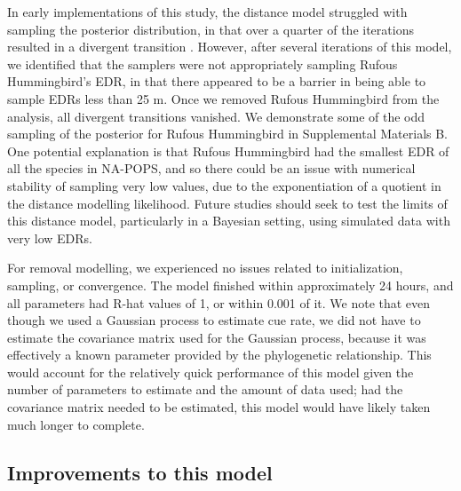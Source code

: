 \documentclass[12pt]{article}
\begin{document}
\par In early implementations of this study, the distance model struggled with sampling the posterior distribution, in that over a quarter of the iterations resulted in a divergent transition \citep{betancourt_diagnosing_2016, leimkuhler_simulating_2005}.
However, after several iterations of this model, we identified that the samplers were not appropriately sampling Rufous Hummingbird's EDR, in that there appeared to be a barrier in being able to sample EDRs less than 25 m. 
Once we removed Rufous Hummingbird from the analysis, all divergent transitions vanished.
We demonstrate some of the odd sampling of the posterior for Rufous Hummingbird in Supplemental Materials B.
One potential explanation is that Rufous Hummingbird had the smallest EDR of all the species in NA-POPS, and so there could be an issue with numerical stability of sampling very low values, due to the exponentiation of a quotient in the distance modelling likelihood.
Future studies should seek to test the limits of this distance model, particularly in a Bayesian setting, using simulated data with very low EDRs.

\par For removal modelling, we experienced no issues related to initialization, sampling, or convergence. 
The model finished within approximately 24 hours, and all parameters had R-hat values of 1, or within 0.001 of it.
We note that even though we used a Gaussian process to estimate cue rate, we did not have to estimate the covariance matrix used for the Gaussian process, because it was effectively a known parameter provided by the phylogenetic relationship.
This would account for the relatively quick performance of this model given the number of parameters to estimate and the amount of data used; had the covariance matrix needed to be estimated, this model would have likely taken much longer to complete.

\subsection{Improvements to this model}
\end{document}
